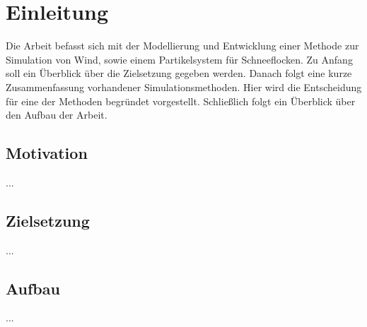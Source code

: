 \section{Einleitung}

Die Arbeit befasst sich mit der Modellierung und Entwicklung einer Methode zur
Simulation von Wind, sowie einem Partikelsystem für Schneeflocken. Zu Anfang
soll ein Überblick über die Zielsetzung gegeben werden. Danach folgt eine kurze
Zusammenfassung vorhandener Simulationsmethoden. Hier wird die Entscheidung für
eine der Methoden begründet vorgestellt. Schließlich folgt ein Überblick über
den Aufbau der Arbeit.

\subsection{Motivation}

...

\subsection{Zielsetzung}

...

\subsection{Aufbau}

...
